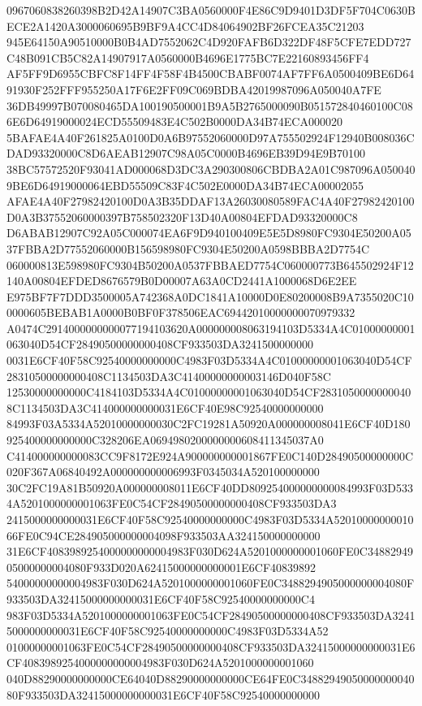 \documentclass[UTF8,fontset=fandol,zihao=-4,a4paper]{ctexart}
\begin{document}
{{0967060838260398B2D42A14907C3BA0560000F4E86C9D9401D3DF5F704C0630BECE2A1420A3000060695B9BF9A4CC4D84064902BF26FCEA35C21203
945E64150A90510000B0B4AD7552062C4D920FAFB6D322DF48F5CFE7EDD727C48B091CB5C82A14907917A0560000B4696E1775BC7E22160893456FF4
AF5FF9D6955CBFC8F14FF4F58F4B4500CBABF0074AF7FF6A0500409BE6D6491930F252FFF955250A17F6E2FF09C069BDBA42019987096A050040A7FE
36DB49997B070080465DA100190500001B9A5B2765000090B051572840460100C086E6D64919000024ECD55509483E4C502B0000DA34B74ECA000020
5BAFAE4A40F261825A0100D0A6B97552060000D97A755502924F12940B008036CDAD93320000C8D6AEAB12907C98A05C0000B4696EB39D94E9B70100
38BC57572520F93041AD000068D3DC3A290300806CBDBA2A01C987096A0500409BE6D64919000064EBD55509C83F4C502E0000DA34B74ECA00002055
AFAE4A40F27982420100D0A3B35DDAF13A26030080589FAC4A40F27982420100D0A3B37552060000397B758502320F13D40A00804EFDAD93320000C8
D6ABAB12907C92A05C000074EA6F9D940100409E5E5D8980FC9304E50200A0537FBBA2D77552060000B156598980FC9304E50200A0598BBBA2D7754C
060000813E598980FC9304B50200A0537FBBAED7754C060000773B645502924F12140A00804EFDED8676579B0D00007A63A0CD2441A1000068D6E2EE
E975BF7F7DDD3500005A742368A0DC1841A10000D0E80200008B9A7355020C100000605BEBAB1A0000B0BF0F378506EAC69442010000000070979332
A0474C2914000000000077194103620A000000008063194103D5334A4C01000000001063040D54CF28490500000000408CF933503DA3241500000000
0031E6CF40F58C92540000000000C4983F03D5334A4C01000000001063040D54CF28310500000000408C1134503DA3C41400000000003146D040F58C
12530000000000C4184103D5334A4C01000000001063040D54CF28310500000000408C1134503DA3C414000000000031E6CF40E98C92540000000000
84993F03A5334A52010000000030C2FC19281A50920A000000008041E6CF40D180925400000000000C328206EA0694980200000000608411345037A0
C414000000000083CC9F8172E924A900000000001867FE0C140D28490500000000C020F367A06840492A000000000006993F0345034A520100000000
30C2FC19A81B50920A000000008011E6CF40DD809254000000000084993F03D5334A5201000000001063FE0C54CF28490500000000408CF933503DA3
2415000000000031E6CF40F58C92540000000000C4983F03D5334A5201000000001066FE0C94CE284905000000004098F933503AA324150000000000
31E6CF4083989254000000000004983F030D624A5201000000001060FE0C3488294905000000004080F933D020A62415000000000001E6CF40839892
54000000000004983F030D624A5201000000001060FE0C3488294905000000004080F933503DA32415000000000031E6CF40F58C92540000000000C4
983F03D5334A5201000000001063FE0C54CF28490500000000408CF933503DA32415000000000031E6CF40F58C92540000000000C4983F03D5334A52
01000000001063FE0C54CF28490500000000408CF933503DA32415000000000031E6CF4083989254000000000004983F030D624A5201000000001060
040D88290000000000CE64040D88290000000000CE64FE0C3488294905000000004080F933503DA32415000000000031E6CF40F58C92540000000000
}}
\end{document}
